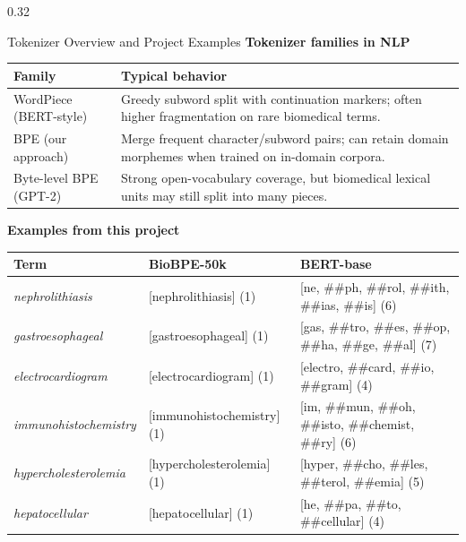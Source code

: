 \documentclass[final]{beamer}
\begin{document}
\begin{frame}[t]
\begin{columns}[t,totalwidth=\textwidth]
\begin{column}{0.32\textwidth}
\begin{block}{Tokenizer Overview and Project Examples}
\justifying
\small
\textbf{Tokenizer families in NLP}
\begin{center}
\begin{tabularx}{0.98\linewidth}{lX}
\toprule
\textbf{Family} & \textbf{Typical behavior} \\
\midrule
WordPiece (BERT-style) & Greedy subword split with continuation markers; often higher fragmentation on rare biomedical terms. \\
BPE (our approach) & Merge frequent character/subword pairs; can retain domain morphemes when trained on in-domain corpora. \\
Byte-level BPE (GPT-2) & Strong open-vocabulary coverage, but biomedical lexical units may still split into many pieces. \\
\bottomrule
\end{tabularx}
\end{center}
\vspace{2em}
\textbf{Examples from this project}
\begin{center}
\small
\begin{tabularx}{0.98\linewidth}{@{}p{7cm}p{9cm}X@{}}
\toprule
Term & BioBPE-50k & BERT-base \\
\midrule
\textit{nephrolithiasis} & [nephrolithiasis] (1) & [ne, \#\#ph, \#\#rol, \#\#ith, \#\#ias, \#\#is] (6) \\
\textit{gastroesophageal} & [gastroesophageal] (1) & [gas, \#\#tro, \#\#es, \#\#op, \#\#ha, \#\#ge, \#\#al] (7) \\
\textit{electrocardiogram} & [electrocardiogram] (1) & [electro, \#\#card, \#\#io, \#\#gram] (4) \\
\textit{immunohistochemistry} & [immunohistochemistry] (1) & [im, \#\#mun, \#\#oh, \#\#isto, \#\#chemist, \#\#ry] (6) \\
\textit{hypercholesterolemia} & [hypercholesterolemia] (1) & [hyper, \#\#cho, \#\#les, \#\#terol, \#\#emia] (5) \\
\textit{hepatocellular} & [hepatocellular] (1) & [he, \#\#pa, \#\#to, \#\#cellular] (4) \\
\bottomrule
\end{tabularx}
\end{center}
\end{block}


\end{column}
\end{columns}
\end{frame}
\end{document}
